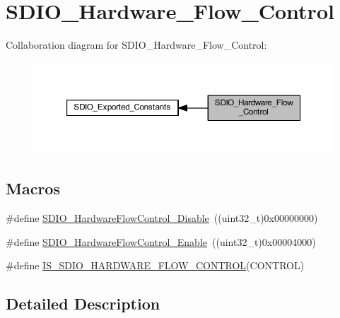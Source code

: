 \hypertarget{group___s_d_i_o___hardware___flow___control}{}\section{S\+D\+I\+O\+\_\+\+Hardware\+\_\+\+Flow\+\_\+\+Control}
\label{group___s_d_i_o___hardware___flow___control}
Collaboration diagram for S\+D\+I\+O\+\_\+\+Hardware\+\_\+\+Flow\+\_\+\+Control\+:
\nopagebreak
\begin{figure}[H]
\begin{center}
\leavevmode
\includegraphics[width=350pt]{group___s_d_i_o___hardware___flow___control}
\end{center}
\end{figure}
\subsection*{Macros}
\begin{DoxyCompactItemize}
\item 
\#define \hyperlink{group___s_d_i_o___hardware___flow___control_ga7529a3c8a11ac685bde4aafa12c8a977}{S\+D\+I\+O\+\_\+\+Hardware\+Flow\+Control\+\_\+\+Disable}~((uint32\+\_\+t)0x00000000)
\item 
\#define \hyperlink{group___s_d_i_o___hardware___flow___control_gab6cfef6778d829f3dcefc6c2bad7c9aa}{S\+D\+I\+O\+\_\+\+Hardware\+Flow\+Control\+\_\+\+Enable}~((uint32\+\_\+t)0x00004000)
\item 
\#define \hyperlink{group___s_d_i_o___hardware___flow___control_gad8be549f8348479d064dff21343ae411}{I\+S\+\_\+\+S\+D\+I\+O\+\_\+\+H\+A\+R\+D\+W\+A\+R\+E\+\_\+\+F\+L\+O\+W\+\_\+\+C\+O\+N\+T\+R\+OL}(C\+O\+N\+T\+R\+OL)
\end{DoxyCompactItemize}


\subsection{Detailed Description}


